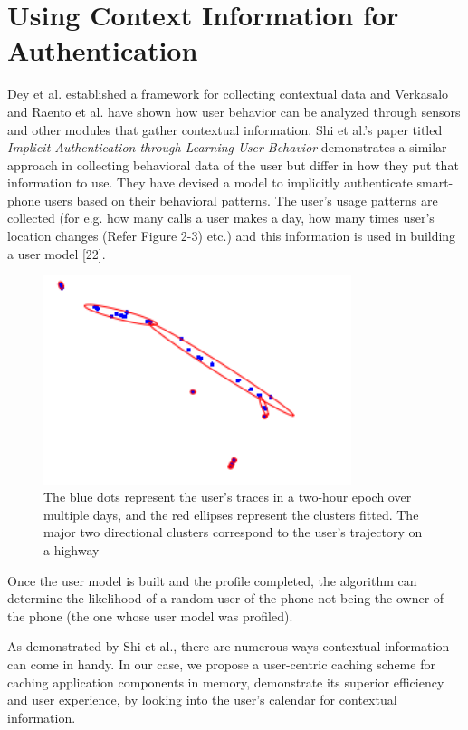 \documentclass[12pt]{uthesis-v12}  %
\begin{document}
	\section{Using Context Information for Authentication}
		Dey et al. established a framework for collecting contextual data and Verkasalo and Raento et al. have shown how user behavior can be analyzed through sensors and other modules that gather contextual information. Shi et al.'s paper titled {\em Implicit Authentication through Learning User Behavior} demonstrates a similar approach in collecting behavioral data of the user but differ in how they put that information to use. They have devised a model to implicitly authenticate smart-phone users based on their behavioral patterns. The user's usage patterns are collected (for e.g. how many calls a user makes a day, how many times user's location changes (Refer Figure 2-3) etc.) and this information is used in building a user model [22].  
		
		\begin{figure}[!ht]
			\centering
			\includegraphics[width = 90mm]{images/gpsTrace.png}
			\caption[User's GPS Trace]
			{The blue dots represent the user’s traces in a two-hour epoch over multiple days, and the red ellipses represent the clusters fitted. The major two directional clusters correspond to the user’s trajectory on a highway}
		\end{figure}		
		Once the user model is built and the profile completed, the algorithm can determine the likelihood of a random user of the phone not being the owner of the phone (the one whose user model was profiled). 
		
		As demonstrated by Shi et al., there are numerous ways contextual information can come in handy. In our case, we propose a user-centric caching scheme for caching application components in memory, demonstrate its superior efficiency and user experience, by looking into the user's calendar for contextual information.  			
	
\end{document}
